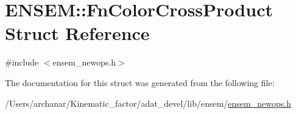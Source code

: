 \hypertarget{structENSEM_1_1FnColorCrossProduct}{}\section{E\+N\+S\+EM\+:\+:Fn\+Color\+Cross\+Product Struct Reference}
\label{structENSEM_1_1FnColorCrossProduct}


{\ttfamily \#include $<$ensem\+\_\+newops.\+h$>$}



The documentation for this struct was generated from the following file\+:\begin{DoxyCompactItemize}
\item 
/\+Users/archanar/\+Kinematic\+\_\+factor/adat\+\_\+devel/lib/ensem/\mbox{\hyperlink{lib_2ensem_2ensem__newops_8h}{ensem\+\_\+newops.\+h}}\end{DoxyCompactItemize}
